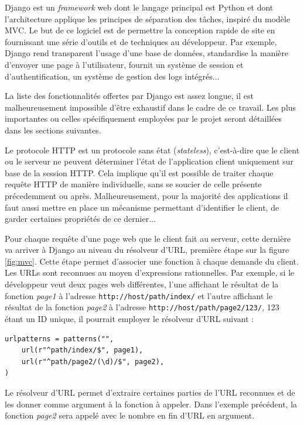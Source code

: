 \documentclass[a4paper,12pt]{article}
\begin{document}
Django est un \textit{framework} web dont le langage principal est Python et
dont l'architecture applique les principes de séparation des tâches, inspiré du
modèle MVC. Le but de ce logiciel est de permettre la conception rapide de site
en fournissant une série d'outils et de techniques au développeur. Par exemple,
Django rend transparent l'usage d'une base de données, standardise la manière
d'envoyer une page à l'utilisateur, fournit un système de session et d'authentification,
un système de gestion des logs intégrés...

La liste des fonctionnalités offertes par Django est assez longue, il est malheureusement
impossible d'être exhaustif dans le cadre de ce travail. Les plus importantes
ou celles spécifiquement employées par le projet seront détaillées dans les sections suivantes.

Le protocole HTTP est un protocole sans état (\textit{stateless}), c'est-à-dire
que le client ou le serveur ne peuvent déterminer l'état de l'application client uniquement
sur base de la session HTTP. Cela implique qu'il est possible de traiter chaque requête HTTP
de manière individuelle, sans se soucier de celle présente précedemment ou après. Malheureusement,
pour la majorité des applications il faut aussi mettre en place un mécanisme permettant
d'identifier le client, de garder certaines propriétés de ce dernier...

Pour chaque requête d'une page web que le client fait au serveur, cette dernière
va arriver à Django au niveau du résolveur d'URL, première étape sur la figure \ref{fig:mvc}.
Cette étape permet d'associer une fonction
à chaque demande du client. Les URLs sont reconnues au moyen d'expressions rationnelles.
Par exemple, si le développeur veut deux pages web différentes, l'une affichant
le résultat de la fonction \textit{page1} à l'adresse \texttt{http://host/path/index/} et
l'autre affichant le résultat de la fonction \textit{page2} à l'adresse
\texttt{http://host/path/page2/123/}, 123 étant un ID unique, il pourrait employer
le résolveur d'URL suivant :

\begin{verbatim}
urlpatterns = patterns("",
    url(r"^path/index/$", page1),
    url(r"^path/page2/(\d)/$", page2),
)
\end{verbatim}

Le résolveur d'URL permet d'extraire certaines parties de l'URL reconnues et de les donner
comme argument à la fonction à appeler. Dans l'exemple précédent, la fonction \textit{page2}
sera appelé avec le nombre en fin d'URL en argument.
\end{document}
